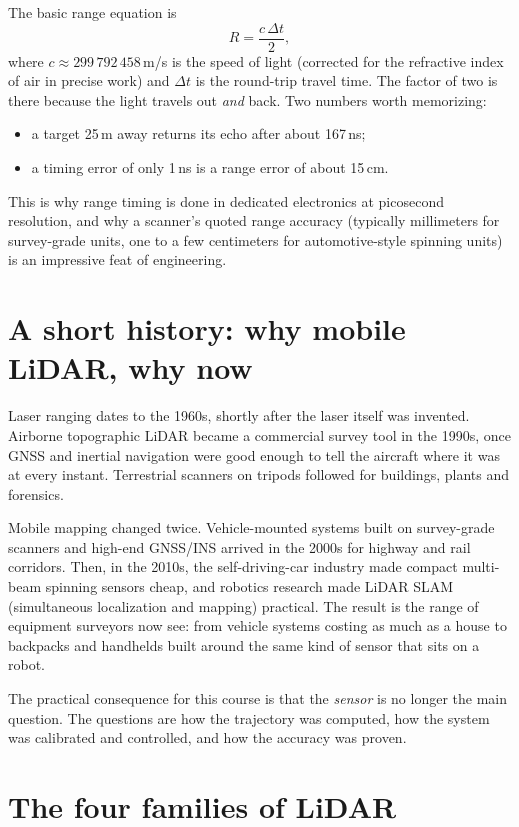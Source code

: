 \begin{eng}
The basic range equation is
\[
R = \frac{c\,\Delta t}{2},
\]
where $c \approx 299\,792\,458$\,m/s is the speed of light (corrected for the refractive index of air in precise work) and $\Delta t$ is the round-trip travel time. The factor of two is there because the light travels out \emph{and} back. Two numbers worth memorizing:
\begin{itemize}
\item a target 25\,m away returns its echo after about 167\,ns;
\item a timing error of only 1\,ns is a range error of about 15\,cm.
\end{itemize}
This is why range timing is done in dedicated electronics at picosecond resolution, and why a scanner's quoted range accuracy (typically millimeters for survey-grade units, one to a few centimeters for automotive-style spinning units) is an impressive feat of engineering.
\end{eng}

\section{A short history: why mobile LiDAR, why now}

Laser ranging dates to the 1960s, shortly after the laser itself was invented. Airborne topographic LiDAR became a commercial survey tool in the 1990s, once GNSS and inertial navigation were good enough to tell the aircraft where it was at every instant. Terrestrial scanners on tripods followed for buildings, plants and forensics.

Mobile mapping changed twice. Vehicle-mounted systems built on survey-grade scanners and high-end GNSS/INS arrived in the 2000s for highway and rail corridors. Then, in the 2010s, the self-driving-car industry made compact multi-beam spinning sensors cheap, and robotics research made LiDAR SLAM (simultaneous localization and mapping) practical. The result is the range of equipment surveyors now see: from vehicle systems costing as much as a house to backpacks and handhelds built around the same kind of sensor that sits on a robot.

The practical consequence for this course is that the \emph{sensor} is no longer the main question. The questions are how the trajectory was computed, how the system was calibrated and controlled, and how the accuracy was proven.

\section{The four families of LiDAR}

